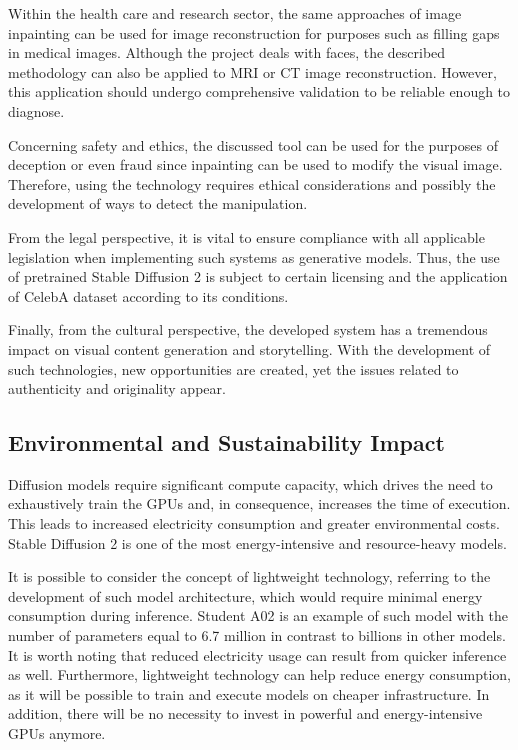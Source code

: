\documentclass[journal]{IEEEtran}
\begin{document}
Within the health care and research sector, the same approaches of image inpainting can be used for image reconstruction for purposes such as filling gaps in medical images. Although the project deals with faces, the described methodology can also be applied to MRI or CT image reconstruction. However, this application should undergo comprehensive validation to be reliable enough to diagnose.

Concerning safety and ethics, the discussed tool can be used for the purposes of deception or even fraud since inpainting can be used to modify the visual image. Therefore, using the technology requires ethical considerations and possibly the development of ways to detect the manipulation.

From the legal perspective, it is vital to ensure compliance with all applicable legislation when implementing such systems as generative models. Thus, the use of pretrained Stable Diffusion 2 is subject to certain licensing and the application of CelebA dataset according to its conditions.

Finally, from the cultural perspective, the developed system has a tremendous impact on visual content generation and storytelling. With the development of such technologies, new opportunities are created, yet the issues related to authenticity and originality appear.

\subsection{Environmental and Sustainability Impact}
Diffusion models require significant compute capacity, which drives the need to exhaustively train the GPUs and, in consequence, increases the time of execution. This leads to increased electricity consumption and greater environmental costs. Stable Diffusion 2 is one of the most energy-intensive and resource-heavy models.

It is possible to consider the concept of lightweight technology, referring to the development of such model architecture, which would require minimal energy consumption during inference. Student A02 is an example of such model with the number of parameters equal to 6.7 million in contrast to billions in other models. It is worth noting that reduced electricity usage can result from quicker inference as well. Furthermore, lightweight technology can help reduce energy consumption, as it will be possible to train and execute models on cheaper infrastructure. In addition, there will be no necessity to invest in powerful and energy-intensive GPUs anymore.
\end{document}

